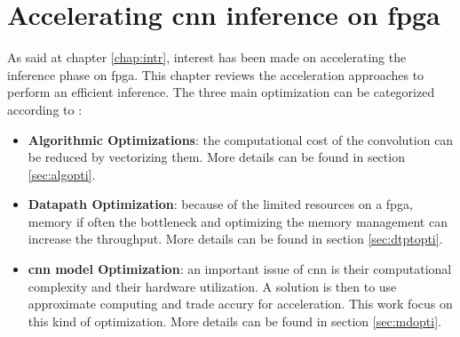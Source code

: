 \chapter{Accelerating \acrshort{cnn} inference on \acrshort{fpga}}
\label{chap:inf}
As said at chapter \ref{chap:intr}, interest has been made on accelerating the inference phase on \acrshort{fpga}. This chapter reviews the acceleration approaches to perform an efficient inference. \newline \newline
The three main optimization can be categorized according to \cite{abdelouahab_accelerating_2018}:
\begin{itemize}
    \item \textbf{Algorithmic Optimizations}: the computational cost of the convolution can be reduced by vectorizing them. More details can be found in section \ref{sec:algopti}.
    \item \textbf{Datapath Optimization}: because of the limited resources on a \acrshort{fpga}, memory if often the bottleneck and optimizing the memory management can increase the throughput. More details can be found in section \ref{sec:dtptopti}.
    \item \textbf{\acrshort{cnn} model Optimization}: an important issue of \acrshort{cnn} is their computational complexity and their hardware utilization. A solution is then to use approximate computing and trade accury for acceleration. This work focus on this kind of optimization. More details can be found in section \ref{sec:mdopti}.
\end{itemize}




